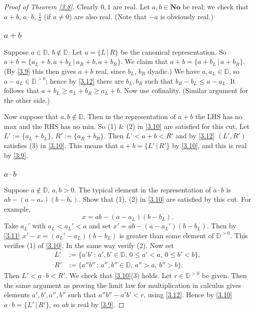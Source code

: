 \begin{proof}[Proof of Theorem \ref{3.8}]
Clearly $0,1$ are real. Let $a,b\in\mathbf{No}$ be real; we check that $a+b$, $a\cdot b$, $\frac1a$ (if $a\ne0$) are also real. (Note that $-a$ is obviously real.)

\subsubsection*{$a+b$} Suppose $a\in\mathbb{D}$, $b\notin\mathbb{D}$. Let $a = \{ L \,|\, R\}$ be the canonical representation. So $a + b = \{ a_L + b,a+b_L \,|\, a_R+b,a+b_R\}$. We claim that $a+b = \{a+b_L \,|\, a+b_R \}$. (By \eqref{3.9} this then gives $a+b$ real, since $b_L$, $b_R$ dyadic.)
We have $a,a_L\in\mathbb{D}$, so $a-a_L\in\mathbb{D}^{>0}$; hence by \eqref{3.12} there are $b_L,b_R$ such that $b_R-b_L\le a-a_L$. It follows that $a+b_L\ge a_L+b_R \ge a_L+b$. Now use cofinality. (Similar argument for the other side.)

Now suppose that $a,b\notin\mathbb{D}$. Then in the representation of $a+b$ the LHS has no max and the RHS has no min. So (1) \& (2) in \eqref{3.10} are satisfied for this cut. Let $L' := \{a_L+b_L\}$, $R' := \{a_R+b_R\}$. Then
$L' < a+b < R'$ and by \eqref{3.12} $(L',R')$ satisfies (3) in \eqref{3.10}. This means that $a+b = \{L' \,|\, R' \}$ by \eqref{3.10}, and this is real by \eqref{3.9}.

\subsubsection*{$a\cdot b$} Suppose $a\notin\mathbb{D}$, $a,b>0$. The typical element in the representation of 
$a\cdot b$ is $ab-(a-a_*)(b-b_*)$. Show that (1), (2) in \eqref{3.10} are satisfied by this cut. For example,
\[ x = ab - (a-a_L)(b-b_L).\]
Take $a_L'$ with $a_L < a_L' < a$ and set $x' = ab - (a-a_L')(b-b_L)$. Then by \eqref{3.11} $x'-x = (a_L' - a_L)(b-b_L)$ is greater than some element of $\mathbb{D}^{>0}$. This verifies (1) of \eqref{3.10}. In the same way verify (2). Now set
\begin{align*}
L' &:= \{ a'b' \,:\, a',b'\in\mathbb{D},\, 0\le a' < a, \, 0\le b' < b\}, \\
R' &:= \{ a''b'' \,:\, a'',b''\in\mathbb{D}, \, a'' > a, \, b'' > b \}.
\end{align*}
Then $L' < a\cdot b < R'$. We check that \eqref{3.10}(3) holds. Let $r\in \mathbb{D}^{>0}$ be given. Then the same 
argument as proving the limit law for multiplication in calculus gives elements $a',b',a'',b''$ such that $a''b''-a'b'<r$, using \eqref{3.12}. Hence by \eqref{3.10} $a\cdot b = \{ L' \,|\, R' \}$, so $ab$ is real by \eqref{3.9}.


\end{proof}
